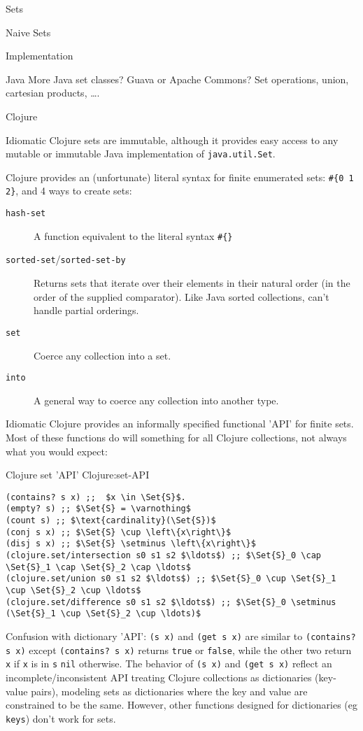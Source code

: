 \begin{plSection}{Sets}
\begin{plSection}{Naive Sets}
\begin{plSection}{Implementation}
\begin{plSection}{Java}
More Java set classes? Guava or Apache Commons?
Set operations, union, cartesian products, \ldots.
\end{plSection}%
\begin{plSection}{Clojure}
\lstset{language=Clojure}

Idiomatic Clojure sets are immutable, although it provides easy
access to any mutable or immutable Java implementation of
\lstinline|java.util.Set|.

Clojure provides an (unfortunate) literal syntax for finite
enumerated sets: 
\lstinline|#{0 1 2}|, and 4 ways to create sets:
\begin{description}
\item[\texttt{hash-set}] A function equivalent to the
literal syntax \lstinline|#{}|
\item[\texttt{sorted-set}/\texttt{sorted-set-by}] Returns
sets that iterate over their elements in their natural order (in the
order of the supplied comparator). Like Java sorted collections,
can't handle partial orderings.
\item[\texttt{set}] Coerce any collection into a set.
\item[\texttt{into}] A general way to coerce any collection
into another type.
\end{description}

Idiomatic Clojure provides an informally specified functional
'API' for finite sets. Most of these functions do will something
for all Clojure collections, not always what you would expect:
\begin{plListing}
{Clojure set 'API'}
{Clojure:set-API}
\begin{lstlisting}
(contains? s x) ;;  $x \in \Set{S}$.
(empty? s) ;; $\Set{S} = \varnothing$
(count s) ;; $\text{cardinality}(\Set{S})$
(conj s x) ;; $\Set{S} \cup \left\{x\right\}$
(disj s x) ;; $\Set{S} \setminus \left\{x\right\}$
(clojure.set/intersection s0 s1 s2 $\ldots$) ;; $\Set{S}_0 \cap \Set{S}_1 \cap \Set{S}_2 \cap \ldots$ 
(clojure.set/union s0 s1 s2 $\ldots$) ;; $\Set{S}_0 \cup \Set{S}_1 \cup \Set{S}_2 \cup \ldots$ 
(clojure.set/difference s0 s1 s2 $\ldots$) ;; $\Set{S}_0 \setminus (\Set{S}_1 \cup \Set{S}_2 \cup \ldots)$
\end{lstlisting}
\end{plListing}

Confusion with dictionary 'API':
 \lstinline|(s x)| and \lstinline|(get s x)| are similar to
 \lstinline|(contains? s x)| except \lstinline|(contains? s x)| returns
 \lstinline|true| or \lstinline|false|, while the other two return
 \lstinline|x| if \lstinline|x| is in \lstinline|s| \lstinline|nil| otherwise.
The behavior of \lstinline|(s x)| and \lstinline|(get s x)| reflect an
incomplete/inconsistent API treating Clojure collections as
dictionaries (key-value pairs), modeling sets as dictionaries
where the key and value are constrained to be the same.
However, other functions designed for dictionaries (eg
\lstinline|keys|) don't work for sets.
 

\end{plSection}
\end{plSection}
\end{plSection}
\end{plSection}
